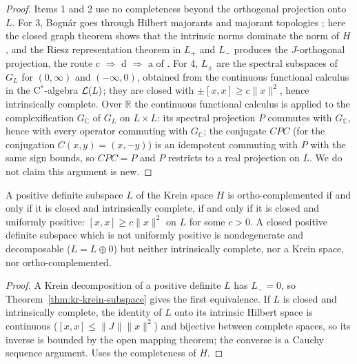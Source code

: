 \begin{proof}
  \leanok
  Items 1 and 2 use no completeness beyond the orthogonal projection onto $L$. For 3, Bognár goes
  through Hilbert majorants and majorant topologies \cite[Theorem~V.1.3]{Bog74}; here the closed
  graph theorem shows that the intrinsic norms dominate the norm of $H$, and the Riesz
  representation theorem in $L_+$ and $L_-$ produces the $J$-orthogonal projection, the route
  c $\Rightarrow$ d $\Rightarrow$ a of \cite[Theorem~1.7.16]{AI89}. For 4, $L_\pm$ are the
  spectral subspaces of $G_L$ for $(0, \infty)$ and $(-\infty, 0)$, obtained from the continuous
  functional calculus in the C$^*$-algebra $\mathcal{L}(L)$; they are closed with $\pm[x, x] \ge c\|x\|^2$,
  hence intrinsically complete. Over $\mathbb{R}$ the continuous functional calculus is applied to
  the complexification $G_{\mathbb{C}}$ of $G_L$ on $L \times L$: its spectral projection $P$
  commutes with $G_{\mathbb{C}}$, hence with every operator commuting with $G_{\mathbb{C}}$; the
  conjugate $CPC$ (for the conjugation $C(x, y) = (x, -y)$) is an idempotent commuting with $P$ with
  the same sign bounds, so $CPC = P$ and $P$ restricts to a real projection on $L$. We do not claim
  this argument is new.
\end{proof}



\begin{proposition}
  \label{prop:kr-krein-posdef}
  \leanok
  A positive definite subspace $L$ of the Krein space $H$ is ortho-complemented if and only if it is
  closed and intrinsically complete, if and only if it is closed and uniformly positive:
  $[x, x] \ge c\|x\|^2$ on $L$ for some $c > 0$. A closed positive definite subspace which is not
  uniformly positive is nondegenerate and decomposable ($L = L \oplus 0$) but neither intrinsically
  complete, nor a Krein space, nor ortho-complemented.
\end{proposition}

\begin{proof}
  \leanok
  A Krein decomposition of a positive definite $L$ has $L_- = 0$, so Theorem~\ref{thm:kr-krein-subspace}
  gives the first equivalence. If $L$ is closed and intrinsically complete, the identity of $L$
  onto its intrinsic Hilbert space is continuous ($[x, x] \le \|J\|\|x\|^2$) and bijective
  between complete spaces, so its inverse is bounded by the open mapping theorem; the converse is a
  Cauchy sequence argument. Uses the completeness of $H$.
\end{proof}


